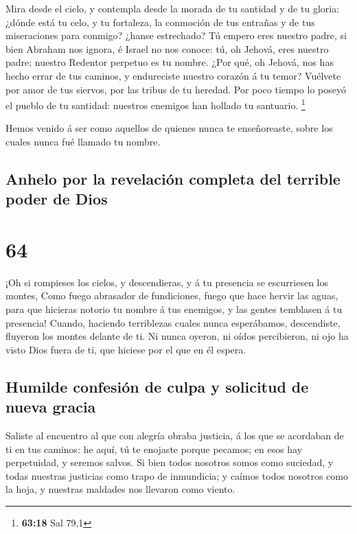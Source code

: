  Mira desde el cielo, y contempla desde la morada de tu
santidad y de tu gloria: ¿dónde está tu celo, y tu fortaleza, la
conmoción de tus entrañas y de tus miseraciones para conmigo? ¿hanse
estrechado?  Tú empero eres nuestro padre, si bien Abraham
nos ignora, é Israel no nos conoce: tú, oh Jehová, eres nuestro padre;
nuestro Redentor perpetuo es tu nombre.  ¿Por qué, oh
Jehová, nos has hecho errar de tus caminos, y endureciste nuestro
corazón á tu temor? Vuélvete por amor de tus siervos, por las tribus de
tu heredad.  Por poco tiempo lo poseyó el pueblo de tu
santidad: nuestros enemigos han hollado tu santuario. \footnote{\textbf{63:18}
  Sal 79,1}

 Hemos venido á ser como aquellos de quienes nunca te
enseñoreaste, sobre los cuales nunca fué llamado tu nombre.

\hypertarget{anhelo-por-la-revelaciuxf3n-completa-del-terrible-poder-de-dios}{%
\subsection{Anhelo por la revelación completa del terrible poder de
Dios}\label{anhelo-por-la-revelaciuxf3n-completa-del-terrible-poder-de-dios}}

\hypertarget{section-63}{%
\section{64}\label{section-63}}

 ¡Oh si rompieses los cielos, y descendieras, y á tu
presencia se escurriesen los montes,  Como fuego abrasador
de fundiciones, fuego que hace hervir las aguas, para que hicieras
notorio tu nombre á tus enemigos, y las gentes temblasen á tu presencia!
 Cuando, haciendo terriblezas cuales nunca esperábamos,
descendiste, fluyeron los montes delante de ti.  Ni nunca
oyeron, ni oídos percibieron, ni ojo ha visto Dios fuera de ti, que
hiciese por el que en él espera.

\hypertarget{humilde-confesiuxf3n-de-culpa-y-solicitud-de-nueva-gracia}{%
\subsection{Humilde confesión de culpa y solicitud de nueva
gracia}\label{humilde-confesiuxf3n-de-culpa-y-solicitud-de-nueva-gracia}}

 Saliste al encuentro al que con alegría obraba justicia, á
los que se acordaban de ti en tus caminos: he aquí, tú te enojaste
porque pecamos; en esos hay perpetuidad, y seremos salvos. 
Si bien todos nosotros somos como suciedad, y todas nuestras justicias
como trapo de inmundicia; y caímos todos nosotros como la hoja, y
nuestras maldades nos llevaron como viento.

